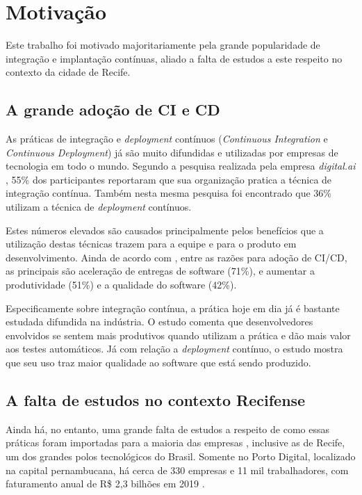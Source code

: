 \section{Motivação}
Este trabalho foi motivado majoritariamente pela grande popularidade de integração e implantação contínuas, aliado a falta de estudos a este respeito no contexto da cidade de Recife.

\subsection{A grande adoção de CI e CD}
As práticas de integração e \emph{deployment} contínuos (\emph{Continuous Integration} e \emph{Continuous Deployment}) já são muito difundidas e utilizadas por empresas de tecnologia em todo o mundo. Segundo a pesquisa realizada pela empresa \emph{digital.ai} \cite{stateAgileReport2020}, 55\% dos participantes reportaram que sua organização pratica a técnica de integração contínua. Também nesta mesma pesquisa foi encontrado que 36\% utilizam a técnica de \emph{deployment} contínuos. 

Estes números elevados são causados principalmente pelos benefícios que a utilização destas técnicas trazem para a equipe e para o produto em desenvolvimento. Ainda de acordo com \cite{stateAgileReport2020}, entre as razões para adoção de CI/CD, as principais são aceleração de entregas de software (71\%), e aumentar a produtividade (51\%) e a qualidade do software (42\%). 

Especificamente sobre integração contínua, a prática hoje em dia já é bastante estudada difundida na indústria. O estudo \cite{hilton2016} comenta que desenvolvedores envolvidos se sentem mais produtivos quando utilizam a prática e dão mais valor aos testes automáticos.  Já com relação a \emph{deployment} contínuo, o estudo \cite{savor2015} mostra que seu uso traz maior qualidade ao software que está sendo produzido. 

\subsection{A falta de estudos no contexto Recifense}

Ainda há, no entanto, uma grande falta de estudos a respeito de como essas práticas foram importadas para a maioria das empresas \cite{empiricalStudy2016}, inclusive as de Recife, um dos grandes polos tecnológicos do Brasil. Somente no Porto Digital, localizado na capital pernambucana, há cerca de 330 empresas e 11 mil trabalhadores, com faturamento anual de R\$ 2,3 bilhões em 2019 \cite{portoDigital}.

